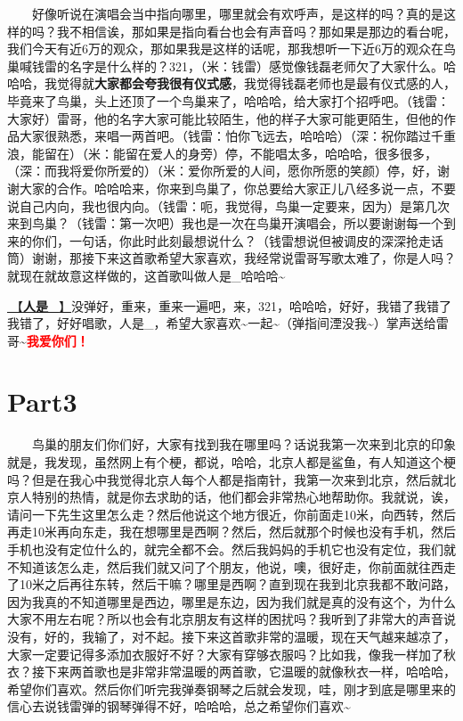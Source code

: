 \documentclass[]{ctexbook}
\begin{document}
  好像听说在演唱会当中指向哪里，哪里就会有欢呼声，是这样的吗？真的是这样的吗？我不相信诶，那如果是指向看台也会有声音吗？那如果是那边的看台呢，我们今天有近6万的观众，那如果我是这样的话呢，那我想听一下近6万的观众在鸟巢喊钱雷的名字是什么样的？321，（米：钱雷）感觉像钱磊老师欠了大家什么。哈哈哈，我觉得就\textbf{大家都会夸我很有仪式感}，我觉得钱磊老师也是最有仪式感的人，毕竟来了鸟巢，头上还顶了一个鸟巢来了，哈哈哈，给大家打个招呼吧。（钱雷：大家好）雷哥，他的名字大家可能比较陌生，他的样子大家可能更陌生，但他的作品大家很熟悉，来唱一两首吧。（钱雷：怕你飞远去，哈哈哈）（深：祝你踏过千重浪，能留在）（米：能留在爱人的身旁）停，不能唱太多，哈哈哈，很多很多，（深：而我将爱你所爱的）（米：爱你所爱的人间，愿你所愿的笑颜）停，好，谢谢大家的合作。哈哈哈来，你来到鸟巢了，你总要给大家正儿八经多说一点，不要说自己内向，我也很内向。（钱雷：呃，我觉得，鸟巢一定要来，因为）是第几次来到鸟巢？（钱雷：第一次吧）我也是一次在鸟巢开演唱会，所以要谢谢每一个到来的你们，一句话，你此时此刻最想说什么？（钱雷想说但被调皮的深深抢走话筒）谢谢，那接下来这首歌希望大家喜欢，我经常说雷哥写歌太难了，你是人吗？就现在就故意这样做的，这首歌叫做人是\_哈哈哈\textasciitilde{}

\hyperref[renshi]{🎵【\textbf{人是\_}】}没弹好，重来，重来一遍吧，来，321，哈哈哈，好好，我错了我错了我错了，好好唱歌，人是\_，希望大家喜欢\textasciitilde 一起\textasciitilde（弹指间湮没我\textasciitilde）掌声送给雷哥\textasciitilde{}\textbf{\textcolor{red}{我爱你们！}}

\section{Part3}\label{beijing-20240922-part3}

  鸟巢的朋友们你们好，大家有找到我在哪里吗？话说我第一次来到北京的印象就是，我发现，虽然网上有个梗，都说，哈哈，北京人都是鲨鱼，有人知道这个梗吗？但是在我心中我觉得北京人每个人都是指南针，我第一次来到北京，然后就北京人特别的热情，就是你去求助的话，他们都会非常热心地帮助你。我就说，诶，请问一下先生这里怎么走？然后他说这个地方很近，你前面走10米，向西转，然后再走10米再向东走，我在想哪里是西啊？然后，然后就那个时候也没有手机，然后手机也没有定位什么的，就完全都不会。然后我妈妈的手机它也没有定位，我们就不知道该怎么走，然后我们就又问了个朋友，他说，噢，很好走，你前面就往西走了10米之后再往东转，然后干嘛？哪里是西啊？直到现在我到北京我都不敢问路，因为我真的不知道哪里是西边，哪里是东边，因为我们就是真的没有这个，为什么大家不用左右呢？所以也会有北京朋友有这样的困扰吗？我听到了非常大的声音说没有，好的，我输了，对不起。接下来这首歌非常的温暖，现在天气越来越凉了，大家一定要记得多添加衣服好不好？大家有穿够衣服吗？比如我，像我一样加了秋衣？接下来两首歌也是非常非常温暖的两首歌，它温暖的就像秋衣一样，哈哈哈，希望你们喜欢。然后你们听完我弹奏钢琴之后就会发现，哇，刚才到底是哪里来的信心去说钱雷弹的钢琴弹得不好，哈哈哈，总之希望你们喜欢\textasciitilde{}
\end{document}

